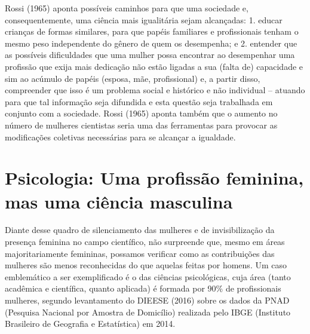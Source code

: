 Rossi (1965) aponta possíveis caminhos para que uma sociedade e, consequentemente, uma ciência mais igualitária sejam alcançadas: 1. educar crianças de formas similares, para que papéis familiares e profissionais tenham o mesmo peso independente do gênero de quem os desempenha; e 2. entender que as possíveis dificuldades que uma mulher possa encontrar ao desempenhar uma profissão que exija mais dedicação não estão ligadas a sua (falta de) capacidade e sim ao acúmulo de papéis (esposa, mãe, profissional) e, a partir disso, compreender que isso é um problema social e histórico e não individual – atuando para que tal informação seja difundida e esta questão seja trabalhada em conjunto com a sociedade. Rossi (1965) aponta também que o aumento no número de mulheres cientistas seria uma das ferramentas para provocar as modificações coletivas necessárias para se alcançar a igualdade.

\section{Psicologia: Uma profissão feminina, mas uma ciência masculina}

Diante desse quadro de silenciamento das mulheres e de invisibilização da presença feminina no campo científico, não surpreende que, mesmo em áreas majoritariamente femininas, possamos verificar como as contribuições das mulheres são menos reconhecidas do que aquelas feitas por homens. Um caso emblemático a ser exemplificado é o das ciências psicológicas, cuja área (tanto acadêmica e científica, quanto aplicada) é formada por 90\% de profissionais mulheres, segundo levantamento do DIEESE (2016) sobre os dados da PNAD (Pesquisa Nacional por Amostra de Domicílio) realizada pelo IBGE (Instituto Brasileiro de Geografia e Estatística) em 2014.

